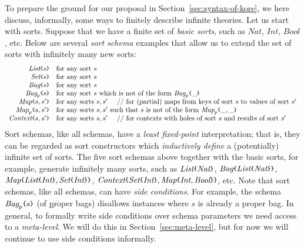 \documentclass[UTF8,11pt]{article}
\theoremstyle{plain}
\theoremstyle{definition}
\theoremstyle{remark}
\newcommand{\Nat}{\textit{Nat}}
\newcommand{\Int}{\textit{Int}}
\newcommand{\Bool}{\textit{Bool}}
\newcommand{\List}{\textit{List}}
\newcommand{\Bag}{\textit{Bag}}
\newcommand{\Set}{\textit{Set}}
\newcommand{\Map}{\textit{Map}}
\newcommand{\Context}{\textit{Context}}
\newcommand{\parametric}[2]{{#1}\raisebox{.2ex}{\texttt{\footnotesize{\{}}}#2\raisebox{.2ex}{\texttt{\footnotesize{\}}}}}
\begin{document}
To prepare the ground for our proposal in Section~\ref{sec:syntax-of-kore},
we here discuss, informally, some ways to finitely describe infinite theories.
Let us start with sorts.
Suppose that we have a finite set of \emph{basic sorts}, such as
$\Nat$, $\Int$, $\Bool$, etc.
Below are several \emph{sort schema} examples that allow us to extend the set
of sorts with infinitely many new sorts:
$$
\begin{array}{rl}
\parametric{\List}{s} &
\textrm{for any sort $s$} \\
\parametric{\Set}{s} &
\textrm{for any sort $s$} \\
\parametric{\Bag}{s} &
\textrm{for any sort $s$} \\
\parametric{\Bag_p}{s} &
\textrm{for any sort $s$ which is not of the form $\parametric{\Bag_p}{\_}$} \\
\parametric{\Map}{s,s'} &
\textrm{for any sorts $s,s'$ \ \ \ // for (partial) maps from keys of sort $s$ to values of sort $s'$} \\
\parametric{\Map_p}{s,s'} &
\textrm{for any sorts $s,s'$ such that $s$ is not of the form $\parametric{\Map_p}{\_,\_}$}
\\
\parametric{\Context}{s,s'} &
\textrm{for any sorts $s,s'$ \ \ \ // for contexts with holes of sort $s$ and results of sort $s'$}
\end{array}
$$
Sort schemas, like all schemas, have a \emph{least fixed-point}
interpretation;
that is, they can be regarded as sort constructors which
{\em inductively define} a (potentially) infinite set of sorts.
The five sort schemas above together with the basic sorts, for example,
generate infinitely many sorts, such as
$\parametric{\List}{\Nat}$,
$\parametric{\Bag}{\parametric{\List}{\Nat}}$,
$\parametric{\Map}{\parametric{\List}{\Int},\parametric{\Set}{\Int}}$,
$\parametric{\Context}{\parametric{\Set}{\Int},\parametric{\Map}{\Int,\Bool}}$,
etc.
Note that sort schemas, like all schemas, can have \emph{side conditions}.
For example, the schema $\parametric{\Bag_p}{s}$ (of \underline{p}roper bags)
disallows instances where $s$ is already a proper bag.
In general, to formally write side conditions over schema parameters we need
access to a \emph{meta-level}.
We will do this in Section~\ref{sec:meta-level}, but for now we will continue
to use side conditions informally.
\end{document}
